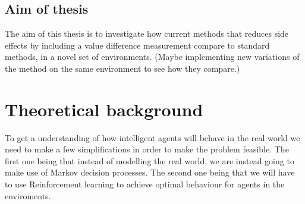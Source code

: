 \documentclass[12pt,A4]{report}
\theoremstyle{definition}
\begin{document}






\section{Aim of thesis}
The aim of this thesis is to investigate how current methods that reduces side effects by including a value difference measurement compare to standard methods, in a novel set of environments. (Maybe implementing new variations of the method on the same environment to see how they compare.) 











\chapter{Theoretical background}
To get a understanding of how intelligent agents will behave in the real world we need to make a few simplifications in order to make the problem feasible. The first one being that instead of modelling the real world, we are instead going to make use of Markov decision processes. The second one being that we will have to use Reinforcement learning to achieve optimal behaviour for agents in the enviroments. 
\end{document}
